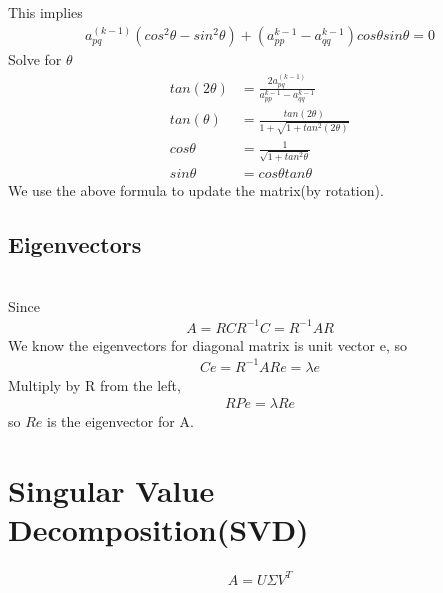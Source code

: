 \documentclass[a4paper]{article}
\begin{document}
This implies
\begin{align*}
	a_{pq}^{(k-1)} (cos^2 \theta - sin^2 \theta) + (a_{pp}^{k-1} - a_{qq}^{k-1}) cos \theta sin \theta = 0
\end{align*}
Solve for $\theta$
\begin{align*}
	tan(2\theta) & = \frac{2 a_{pq}^{(k-1)}}{a_{pp}^{k-1} - a_{qq}^{k-1}} \\
	tan(\theta) & = \frac{tan(2 \theta)}{1 + \sqrt{1 + tan^2 (2 \theta)}} \\
	cos \theta & = \frac{1}{\sqrt{1 + tan^2 \theta}} \\
	sin \theta & = cos \theta tan \theta
\end{align*}
We use the above formula to update the matrix(by rotation). \\
\subsection{Eigenvectors}\\
Since 
\begin{align*}
	A = R C R^{-1}
	C = R^{-1} A R 
\end{align*}
We know the eigenvectors for diagonal matrix is unit vector e, so
\begin{align*}
	Ce = R^{-1} A R e = \lambda e
\end{align*}
Multiply by R from the left, 
\begin{align*}
	RPe = \lambda Re
\end{align*}
so $Re$ is the eigenvector for A.
\section{Singular Value Decomposition(SVD)}
\begin{align*}
	A = U \Sigma V^T
\end{align*}
\end{document}
